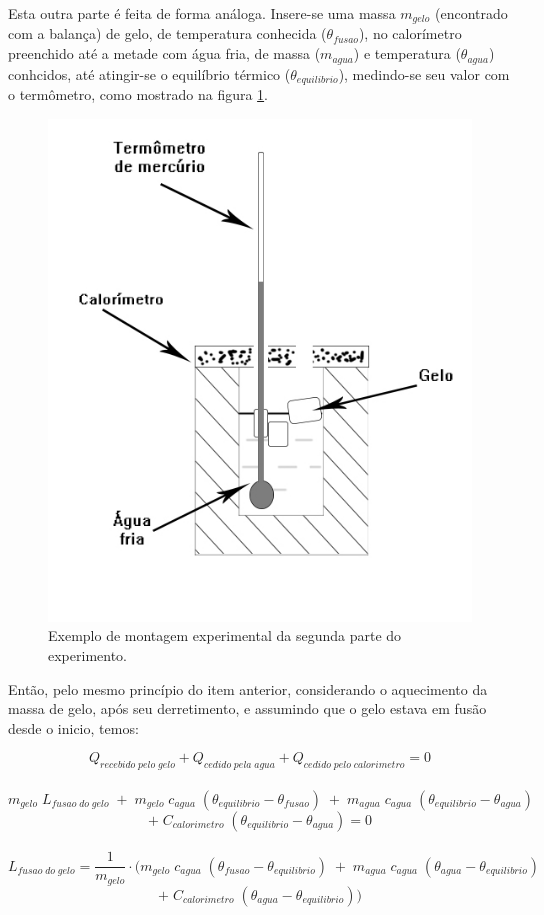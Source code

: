 \documentclass[12pt,a4paper]{article}
\begin{document}
Esta outra parte é feita de forma análoga. Insere-se uma massa $m_{gelo}$ (encontrado com a balança) de gelo, de temperatura conhecida ($\theta_{fusao}$), no calorímetro preenchido até a metade com água fria, de massa ($m_{agua}$) e temperatura ($\theta_{agua}$) conhcidos, até atingir-se o equilíbrio térmico ($\theta_{equilibrio}$), medindo-se seu valor com o termômetro, como mostrado na figura \ref{CalorGelo}.

\begin{figure}[!htbp]
\centering
\includegraphics[scale=0.45]{Fig6b2.jpg}
\caption{Exemplo de montagem experimental da segunda parte do experimento.}
\label{CalorGelo}
\end{figure}

Então, pelo mesmo princípio do item anterior, considerando o aquecimento da massa de gelo, após seu derretimento, e assumindo que o gelo estava em fusão desde o inicio, temos:

$$Q_{recebido\;pelo\;gelo} + Q_{cedido\;pela\;agua} + Q_{cedido\;pelo\;calorimetro} = 0$$\
$$m_{gelo} \; L_{fusao\;do\;gelo} \; + \; m_{gelo} \; c_{agua} \; (\theta_{equilibrio} - \theta_{fusao}) \; + \; m_{agua} \; c_{agua} \; (\theta_{equilibrio} - \theta_{agua}) \;$$ $$+ \; C_{calorimetro} \; (\theta_{equilibrio} - \theta_{agua}) = 0$$\
$$L_{fusao\;do\;gelo} = \frac{1}{m_{gelo}} \cdot (m_{gelo} \; c_{agua} \; (\theta_{fusao} - \theta_{equilibrio}) \; + \; m_{agua} \; c_{agua} \; (\theta_{agua} - \theta_{equilibrio}) \;$$ 
$$ + \; C_{calorimetro} \; (\theta_{agua} - \theta_{equilibrio}))$$
\end{document}
